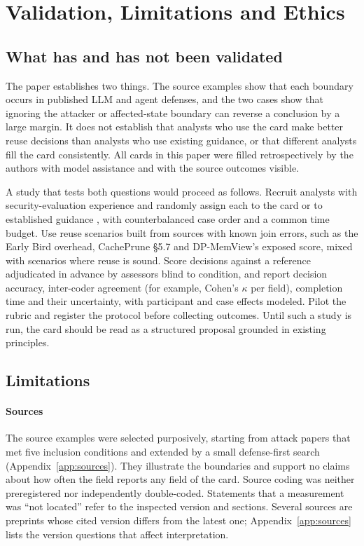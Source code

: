 \section{Validation, Limitations and Ethics}\label{sec:agenda}
\subsection{What has and has not been validated}\label{sec:validation}
The paper establishes two things. The source examples show that each boundary occurs in published LLM and agent defenses, and the two cases show that ignoring the attacker or affected-state boundary can reverse a conclusion by a large margin. It does not establish that analysts who use the card make better reuse decisions than analysts who use existing guidance, or that different analysts fill the card consistently. All cards in this paper were filled retrospectively by the authors with model assistance and with the source outcomes visible.

A study that tests both questions would proceed as follows. Recruit analysts with security-evaluation experience and randomly assign each to the card or to established guidance \cite{carlini2019evaluating,mathews2023critical}, with counterbalanced case order and a common time budget. Use reuse scenarios built from sources with known join errors, such as the Early Bird overhead, CachePrune \S5.7 and DP-MemView's exposed score, mixed with scenarios where reuse is sound. Score decisions against a reference adjudicated in advance by assessors blind to condition, and report decision accuracy, inter-coder agreement (for example, Cohen's $\kappa$ per field), completion time and their uncertainty, with participant and case effects modeled. Pilot the rubric and register the protocol before collecting outcomes. Until such a study is run, the card should be read as a structured proposal grounded in existing principles.

\subsection{Limitations}\label{sec:limitations}\label{sec:validity}
\paragraph{Sources}
The source examples were selected purposively, starting from attack papers that met five inclusion conditions and extended by a small defense-first search (Appendix~\ref{app:sources}). They illustrate the boundaries and support no claims about how often the field reports any field of the card. Source coding was neither preregistered nor independently double-coded. Statements that a measurement was ``not located'' refer to the inspected version and sections. Several sources are preprints whose cited version differs from the latest one; Appendix~\ref{app:sources} lists the version questions that affect interpretation.

